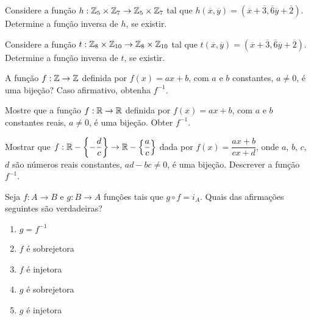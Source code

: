 \documentclass[12pt]{exam}
\begin{document}
    \vspace{.3cm}

    \questao{} Considere a fun{\c c}{\~a}o $h : \mathbb{Z}_5 \times \mathbb{Z}_7 \to \mathbb{Z}_5 \times \mathbb{Z}_7$ tal que $h(\overline{x},\overline{y}) = (\overline{x} + \overline{3}, \overline{6}\overline{y} + \overline{2})$. Determine a fun\c{c}\~ao inversa de $h$, se existir.

    \vspace{.3cm}

    \questao{} Considere a fun{\c c}{\~a}o $t : \mathbb{Z}_8 \times \mathbb{Z}_{10} \to \mathbb{Z}_8 \times \mathbb{Z}_{10}$ tal que $t(\overline{x},\overline{y}) = (\overline{x} + \overline{3}, \overline{6}\overline{y} + \overline{2})$. Determine a fun\c{c}\~ao inversa de $t$, se existir.

    \vspace{.3cm}

    \questao{} A fun{\c c}{\~a}o $f : \mathbb{Z} \to \mathbb{Z}$ definida por $f(x) = ax + b$, com $a$ e $b$ constantes, $a \ne 0$, {\'e} uma bije{\c c}{\~a}o? Caso afirmativo, obtenha $f^{-1}$.

    \vspace{.3cm}


    \questao{} Mostre que a fun{\c c}{\~a}o $f : \mathbb{R} \to \mathbb{R}$ definida por $f(x) = ax + b$, com $a$ e $b$ constantes reais, $a \ne 0$, {\'e} uma bije{\c c}{\~a}o. Obter $f^{-1}$.

    \vspace{.3cm}

    \questao{} Mostrar que $f : \mathbb{R} - \left\{-\dfrac{d}{c}\right\} \to \mathbb{R}  - \left\{\dfrac{a}{c}\right\}$ dada por $f(x) =  \dfrac{ax + b}{cx + d}$, onde $a$, $b$, $c$, $d$ s{\~a}o n{\'u}meros reais constantes, $ad - bc \ne 0$, {\'e} uma bije{\c c}{\~a}o. Descrever a fun{\c c}{\~a}o $f^{-1}$.

    \vspace{.3cm}

    \questao{} Seja $f : A \to B$ e $g : B \to A$ fun\c{c}\~oes tais que $g \circ f = i_A$. Quais das afirma\c{c}\~oes seguintes s\~ao verdadeiras?
    \begin{enumerate}[label={\alph*})]
        \item $g = f^{-1}$

        \item $f$ \'e sobrejetora

        \item $f$ \'e injetora

        \item $g$ \'e sobrejetora

        \item $g$ \'e injetora
    \end{enumerate}
\end{document}
